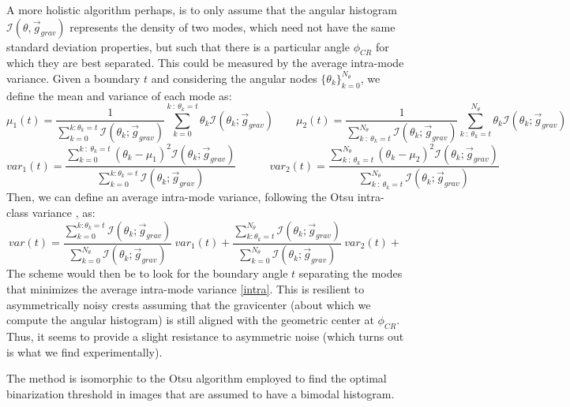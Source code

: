 \documentclass[11pt, a4paper, twoside]{article} %
\begin{document}
A more holistic algorithm perhaps, is to only assume that the angular histogram $\mathcal{I}(\theta,\vec{g}_{grav})$ represents the density of two modes, which need not have the same standard deviation properties, but such that there is a particular angle $\phi_{CR}$ for which they are best separated. This could be measured by the average intra-mode variance. Given a boundary $t$ and considering the angular nodes $\{\theta_k\}_{k=0}^{N_\theta}$, we define the mean and variance of each mode as:
\begin{equation}
\mu_1(t) = \frac{1}{\sum_{k=0}^{k:\theta_k=t}\mathcal{I}(\theta_k; \vec{g}_{grav})}\sum_{k=0}^{k\ :\ \theta_k=t} \theta_k\mathcal{I}(\theta_k; \vec{g}_{grav})\quad  \quad \mu_2(t) = \frac{1}{\sum_{k\ :\ \theta_k=t}^{N_{\theta}}\mathcal{I}(\theta_k; \vec{g}_{grav})}\sum_{k\ :\ \theta_k=t}^{N_{\theta}} \theta_k\mathcal{I}(\theta_k; \vec{g}_{grav})
\end{equation}
\begin{equation}
var_1(t)= \frac{\sum_{k=0}^{k\ :\ \theta_k=t} (\theta_k-\mu_1)^2\mathcal{I}(\theta_k; \vec{g}_{grav})}{\sum_{k=0}^{k:\theta_k=t}\mathcal{I}(\theta_k; \vec{g}_{grav})}\quad  \quad \quad var_2(t) = \frac{\sum_{k\ :\ \theta_k=t}^{N_{\theta}} (\theta_k-\mu_2)^2\mathcal{I}(\theta_k; \vec{g}_{grav})}{\sum_{k\ :\ \theta_k=t}^{N_{\theta}}\mathcal{I}(\theta_k; \vec{g}_{grav})}
\end{equation}
Then, we can define an average intra-mode variance, following the Otsu intra-class variance \cite{Otsu}, as:
\begin{equation}\label{intra}
var(t) = \frac{\sum_{k=0}^{k:\theta_k=t}\mathcal{I}(\theta_k; \vec{g}_{grav})}{\sum_{k=0}^{N_{\theta}}\mathcal{I}(\theta_k; \vec{g}_{grav})}\ var_1(t)+\frac{\sum_{k:\theta_k=t}^{N_{\theta}}\mathcal{I}(\theta_k; \vec{g}_{grav})}{\sum_{k=0}^{N_{\theta}}\mathcal{I}(\theta_k; \vec{g}_{grav})}\ var_2(t)+
\end{equation}
The scheme would then be to look for the boundary angle $t$ separating the modes that minimizes the average intra-mode variance \eqref{intra}. This is resilient to asymmetrically noisy crests assuming that the gravicenter (about which we compute the angular histogram) is still aligned with the geometric center at $\phi_{CR}$. Thus, it seems to provide a slight resistance to asymmetric noise (which turns out is what we find experimentally).

The method is isomorphic to the Otsu algorithm \cite{Otsu} employed to find the optimal binarization threshold in images that are assumed to have a bimodal histogram.
\end{document}
